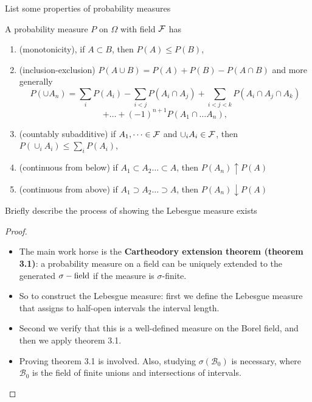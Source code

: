 \documentclass[avery5388,grid,frame]{flashcards}
\begin{document}
\begin{flashcard}
    {List some properties of probability measures}
    \begin{properties}
        A probability measure $P$ on $\Omega$ with field $\mathcal F$ has
        \begin{enumerate}
            \item (monotonicity), if $A \subset B$, then $P(A) \leq P(B)$,
            \item (inclusion-exclusion) $P(A \cup B) = P(A) + P(B) - P(A \cap B)$ and more generally
            $$P(\cup A_n) = \sum_i P(A_i) - \sum_{i < j} P(A_i \cap A_j) + \sum_{i < j < k} P(A_i \cap A_j \cap A_k)$$
            $$+ \dots + (-1)^{n+1} P(A_1 \cap \dots A_n),$$
            \item (countably subadditive) if $A_1, \dots \in \mathcal F$ and $\cup_i A_i \in \mathcal F$, then $P(\cup_i A_i) \leq \sum_i P(A_i)$,
            \item (continuous from below) if $A_1 \subset A_2 \dots \subset A$, then $P(A_n) \uparrow P(A)$
            \item (continuous from above) if $A_1 \supset A_2 \dots \supset A$, then $P(A_n) \downarrow P(A)$
        \end{enumerate}
    \end{properties}
\end{flashcard}


\begin{flashcard}
    {Briefly describe the process of showing the Lebesgue measure exists}
    \begin{proof}
        \begin{itemize}
            \item The main work horse is the \textbf{Cartheodory extension theorem (theorem 3.1)}: a probability measure on a field can be uniquely extended to the generated $\sigma-\text{field}$ if the measure is $\sigma$-finite.
            \item So to construct the Lebesgue measure: first we define the Lebesgue measure that assigns to half-open intervals the interval length.
            \item Second we verify that this is a well-defined measure on the Borel field, and then we apply theorem 3.1.
            \item Proving theorem 3.1 is involved. Also, studying $\sigma(\mathcal B_0)$ is necessary, where $\mathcal B_0$ is the field of finite unions and intersections of intervals.
        \end{itemize}
    \end{proof}
\end{flashcard}
\end{document}

